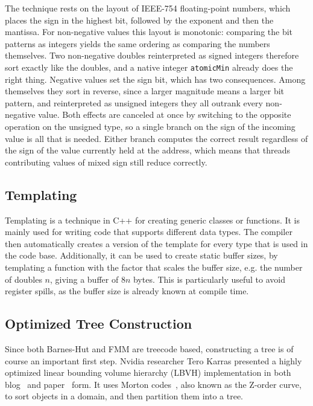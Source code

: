 The technique rests on the layout of IEEE-754 floating-point numbers, which places the sign in the highest bit, followed by the exponent and then the mantissa.
For non-negative values this layout is monotonic: comparing the bit patterns as integers yields the same ordering as comparing the numbers themselves.
Two non-negative doubles reinterpreted as signed integers therefore sort exactly like the doubles, and a native integer \texttt{atomicMin} already does the right thing.
Negative values set the sign bit, which has two consequences.
Among themselves they sort in reverse, since a larger magnitude means a larger bit pattern, and reinterpreted as unsigned integers they all outrank every non-negative value.
Both effects are canceled at once by switching to the opposite operation on the unsigned type, so a single branch on the sign of the incoming value is all that is needed.
Either branch computes the correct result regardless of the sign of the value currently held at the address, which means that threads contributing values of mixed sign still reduce correctly.

\subsection{Templating}

Templating is a technique in C++ for creating generic classes or functions.
It is mainly used for writing code that supports different data types.
The compiler then automatically creates a version of the template for every type that is used in the code base.
Additionally, it can be used to create static buffer sizes, by templating a function with the factor that scales the buffer size, e.g. the number of doubles $n$, giving a buffer of $8n$ bytes.
This is particularly useful to avoid register spills, as the buffer size is already known at compile time.


\subsection{Optimized Tree Construction}
\label{sec:optimization-techniques-cuda-optimizations-lbhv}

Since both Barnes-Hut and FMM are treecode based, constructing a tree is of course an important first step.
Nvidia researcher Tero Karras presented a highly optimized linear bounding volume hierarchy (LBVH) implementation in both blog~\cite{karras2012thinkingparallel} and paper~\cite{karras2012lbvh} form.
It uses Morton codes~\cite{morton1966geodetic}, also known as the Z-order curve, to sort objects in a domain, and then partition them into a tree.

